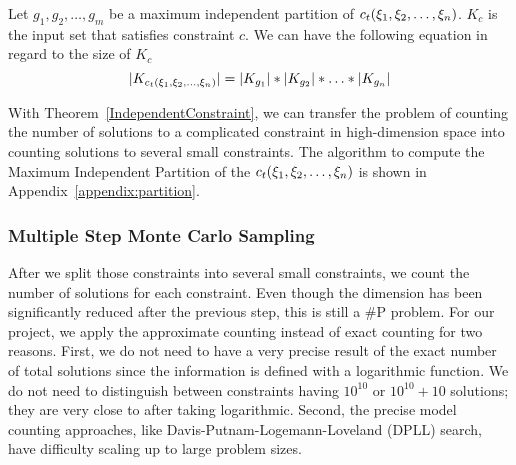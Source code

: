 \begin{theorem}
      \label{IndependentConstraint}
      Let $g_{1}, g_{2}, \ldots, g_{m}$ be a maximum independent partition of
      $c_t({\xi}_{1},{\xi}_{2},\ldots,{\xi}_{n})$.
      $K_c$ is the input set that satisfies constraint $c$. We can have the following
      equation in regard to the size of $K_c$
      $$|K_{c_t({\xi}_{1},{\xi}_{2},\ldots,{\xi}_{n})}| = |K_{g_{1}}|*|K_{g_{2}}|*\ldots*|K_{g_{n}}|$$
\end{theorem}

With Theorem~\ref{IndependentConstraint}, we can transfer the problem of
counting the number of solutions to a complicated constraint in high-dimension
space into counting solutions to several small constraints. The algorithm to
compute the Maximum Independent Partition of the
$c_t({\xi}_{1},{\xi}_{2},\ldots,{\xi}_{n})$ is shown in
Appendix~\ref{appendix:partition}.



\subsubsection{Multiple Step Monte Carlo Sampling}

After we split those constraints into several small constraints, we count the
number of solutions for each constraint. Even though the dimension has been
significantly reduced after the previous step, this is still a \#P problem. For our
project, we apply the approximate counting instead of exact counting for two
reasons. First, we do not need to have a very precise result of the exact number
of total solutions since the information is defined with a logarithmic function.
We do not need to distinguish between constraints having $10^{10}$ or $10^{10} +
10$ solutions; they are very close to after taking logarithmic. Second, the
precise model counting approaches, like Davis-Putnam-Logemann-Loveland (DPLL)
search, have difficulty scaling up to large problem sizes.

